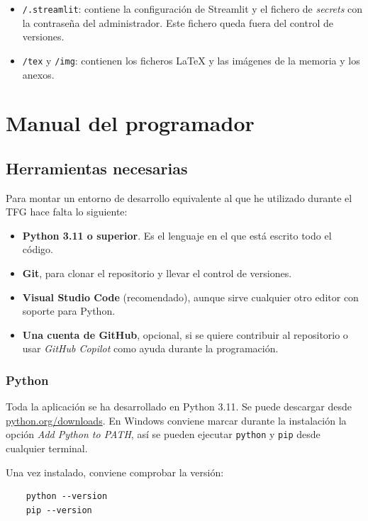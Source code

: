 \begin{itemize}
	\item \texttt{/.streamlit}: contiene la configuración de Streamlit y el fichero de \textit{secrets} con la contraseña del administrador. Este fichero queda fuera del control de versiones.
	
	\item \texttt{/tex} y \texttt{/img}: contienen los ficheros \LaTeX{} y las imágenes de la memoria y los anexos.
\end{itemize}

\section{Manual del programador}

\subsection{Herramientas necesarias}

Para montar un entorno de desarrollo equivalente al que he utilizado durante el TFG hace falta lo siguiente:

\begin{itemize}
	\item \textbf{Python 3.11 o superior}. Es el lenguaje en el que está escrito todo el código.
	\item \textbf{Git}, para clonar el repositorio y llevar el control de versiones.
	\item \textbf{Visual Studio Code} (recomendado), aunque sirve cualquier otro editor con soporte para Python.
	\item \textbf{Una cuenta de GitHub}, opcional, si se quiere contribuir al repositorio o usar \textit{GitHub Copilot} como ayuda durante la programación.
\end{itemize}

\subsubsection{Python}

Toda la aplicación se ha desarrollado en Python 3.11. Se puede descargar desde \href{https://www.python.org/downloads/}{python.org/downloads}. En Windows conviene marcar durante la instalación la opción \textit{Add Python to PATH}, así se pueden ejecutar \texttt{python} y \texttt{pip} desde cualquier terminal.

Una vez instalado, conviene comprobar la versión:

\begin{verbatim}
	python --version
	pip --version
\end{verbatim}

